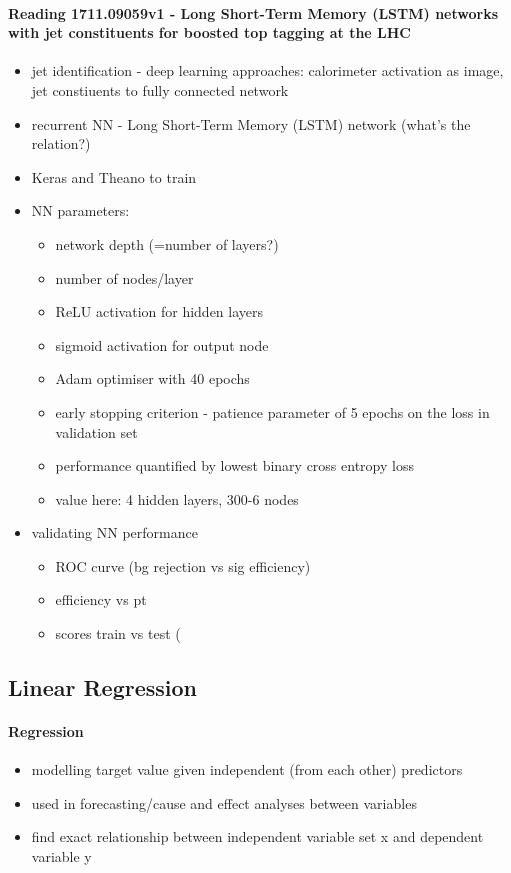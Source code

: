 \paragraph{Reading 1711.09059v1 - Long Short-Term Memory (LSTM) networks with jet constituents for boosted top tagging at the LHC}
\begin{itemize}
  \item jet identification - deep learning approaches: calorimeter activation as image, jet constiuents to fully connected network
  \item recurrent NN - Long Short-Term Memory (LSTM) network (what's the relation?)
  \item Keras and Theano to train
  \item NN parameters:
	\begin{itemize}
	  \item network depth (=number of layers?)
	  \item number of nodes/layer
	  \item ReLU activation for hidden layers
	  \item sigmoid activation for output node
	  \item Adam optimiser with 40 epochs
	  \item early stopping criterion - patience parameter of 5 epochs on the loss in validation set
	  \item performance quantified by lowest binary cross entropy loss
	  \item value here: 4 hidden layers, 300-6 nodes
	\end{itemize}
  \item validating NN performance
	\begin{itemize}
	  \item ROC curve (bg rejection vs sig efficiency)
	  \item efficiency vs pt
	  \item scores train vs test (
	\end{itemize}

\end{itemize}


\subsection{Linear Regression}

\paragraph{Regression}
\begin{itemize}
  \item modelling target value given independent (from each other) predictors
  \item used in forecasting/cause and effect analyses between variables
  \item find exact relationship between independent variable set x and dependent variable y
\end{itemize}

